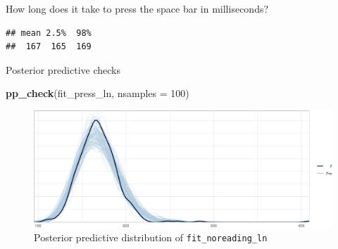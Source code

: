 \documentclass[12pt,ignorenonframetext,aspectratio=169]{beamer}
\newenvironment{Shaded}{\begin{snugshade}}{\end{snugshade}}
\newcommand{\DataTypeTok}[1]{\textcolor[rgb]{0.13,0.29,0.53}{#1}}
\newcommand{\DecValTok}[1]{\textcolor[rgb]{0.00,0.00,0.81}{#1}}
\newcommand{\FloatTok}[1]{\textcolor[rgb]{0.00,0.00,0.81}{#1}}
\newcommand{\KeywordTok}[1]{\textcolor[rgb]{0.13,0.29,0.53}{\textbf{#1}}}
\newcommand{\NormalTok}[1]{#1}
\newcommand{\OperatorTok}[1]{\textcolor[rgb]{0.81,0.36,0.00}{\textbf{#1}}}
\newcommand{\StringTok}[1]{\textcolor[rgb]{0.31,0.60,0.02}{#1}}
\begin{document}
\begin{frame}[fragile]

\begin{block}{How long does it take to press the space bar in milliseconds?}

\scriptsize

\begin{Shaded}
\end{Shaded}

\begin{verbatim}
## mean 2.5%  98% 
##  167  165  169
\end{verbatim}

\normalsize

\end{block}

\end{frame}

\begin{frame}[fragile]{Posterior predictive checks}
\protect\hypertarget{posterior-predictive-checks}{}



\small

\begin{Shaded}
\begin{Highlighting}[]
\KeywordTok{pp_check}\NormalTok{(fit_press_ln, }\DataTypeTok{nsamples =} \DecValTok{100}\NormalTok{)}
\end{Highlighting}
\end{Shaded}

\begin{figure}
\centering
\includegraphics{03-compbayes-slides_files/figure-beamer/lognppc-1.pdf}
\caption{\label{fig:lognppc}Posterior predictive distribution of \texttt{fit\_noreading\_ln}}
\end{figure}

\normalsize

\end{frame}
\end{document}
